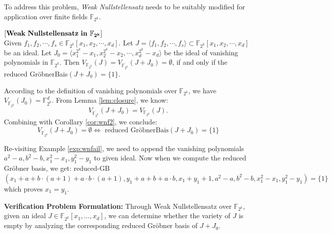 To address this problem, {\it Weak Nullstellensatz} needs to be suitably
modified for application over finite fields $\mathbb{F}_{2^{k}}$. 
\begin{Theorem}\label{wnull:ff}
$[\bf{Weak~Nullstellensatz~in~\mathbb{F}_{2^k}}]$\\
Given $f_1,f_2,\cdots,f_s \in \mathbb{F}_{2^k}[x_1,x_2,\cdots,x_d]$. 
Let $J=\langle f_1,f_2,\cdots,f_s\rangle \subset \mathbb{F}_{2^k}[x_1,
x_2, \cdots, x_d]$ be an ideal. Let $J_0 = \langle 
x_1^{2^k}-x_1,x_2^{2^k}-x_2,\cdots,x_d^{2^k}-x_d \rangle$ be the ideal
of vanishing polynomials in $\mathbb{F}_{2^k}$. Then
$V_{\mathbb{F}_{2^k}}(J) = V_{\overline {\mathbb{F}_{2^k}}}(J +
J_0)=\emptyset$,  if and only if the reduced
Gr\"obnerBais$(J+J_{0})=\{1\}$. 
\end{Theorem}
 
\begin{Proof}
According to the definition of vanishing polynomials over
$\mathbb{F}_{2^k}$, we have $V_{\overline
  {\mathbb{F}_{2^k}}}(J_0)={\mathbb{F}_{2^k}^d}$. 
From Lemma \ref{lem:closure}, we know:
\begin{equation}
	V_{\overline {\mathbb{F}_{2^k}}}(J+J_0)=V_{\mathbb{F}_{2^k}}(J). 
\end{equation}
Combining with Corollary \ref{cor:wnf2}, we conclude:
\begin{equation}
V_{\overline {\mathbb{F}_{2^k}}}(J+J_0)=\emptyset \Leftrightarrow
\text{ reduced Gr\"obnerBais}(J+J_0) =\{ 1\}
\end{equation}
\end{Proof}

\begin{Example}
Re-visiting Example \ref{exp:wnfail}, we need to append the vanishing
polynomials $a^2-a,b^2-b,x_1^2-x_1,y_1^2-y_1$ to given ideal.  Now
when we compute the reduced Gr\"obner basis, we get: reduced-GB$(x_1+
a + b\cdot(a+1) + a\cdot b\cdot(a+1),y_1+a+b+a\cdot
b,x_1+y_1+1,a^2-a,b^2-b,x_1^2-x_1,y_1^2-y_1)=\{1\}$ which proves
$x_1=y_1$. 
\end{Example}


{\bf Verification Problem Formulation:}
Through Weak Nullstellensatz over $\mathbb{F}_{{2^k}}$, given an ideal
$J \in \mathbb{F}_{2^k}[x_{1},\dots,x_{d}]$,  we can determine whether
the variety of $J$ is empty by analyzing the corresponding reduced
Gr\"obner basis of $J+J_0$. 

